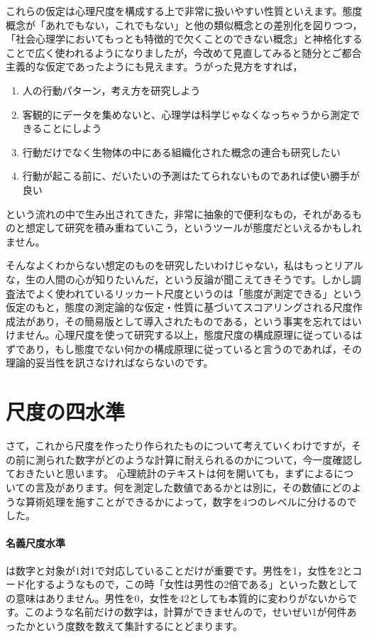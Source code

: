 \documentclass{ltjsbook}
\begin{document}
これらの仮定は心理尺度を構成する上で非常に扱いやすい性質といえます。態度概念が「あれでもない，これでもない」と他の類似概念との差別化を図りつつ，「社会心理学においてもっとも特徴的で欠くことのできない概念\citep{Allport1935}」と神格化することで広く使われるようになりましたが，今改めて見直してみると随分とご都合主義的な仮定であったようにも見えます。うがった見方をすれば，
\begin{enumerate}
    \item 人の行動パターン，考え方を研究しよう
    \item 客観的にデータを集めないと、心理学は科学じゃなくなっちゃうから測定できることにしよう
    \item 行動だけでなく生物体の中にある組織化された概念の連合も研究したい
    \item 行動が起こる前に、だいたいの予測はたてられないものであれば使い勝手が良い
\end{enumerate}
という流れの中で生み出されてきた，非常に抽象的で便利なもの，それがあるものと想定して研究を積み重ねていこう，というツールが態度だといえるかもしれません。


そんなよくわからない想定のものを研究したいわけじゃない，私はもっとリアルな，生の人間の心が知りたいんだ，という反論が聞こえてきそうです。しかし調査法でよく使われているリッカート尺度というのは「態度が測定できる」という仮定のもと，態度の測定論的な仮定・性質に基づいてスコアリングされる尺度作成法があり，その簡易版として導入されたものである，という事実を忘れてはいけません。心理尺度を使って研究する以上，態度尺度の構成原理に従っているはずであり，もし態度でない何かの構成原理に従っていると言うのであれば，その理論的妥当性を訊さなければならないのです。

\section{尺度の四水準}
さて，これから尺度を作ったり作られたものについて考えていくわけですが，その前に測られた数字がどのような計算に耐えられるのかについて，今一度確認しておきたいと思います。
心理統計のテキストは何を開いても，まず\citet{stevens1946}によるについての言及があります。何を測定した数値であるかとは別に，その数値にどのような算術処理を施すことができるかによって，数字を4つのレベルに分けるのでした。

\paragraph{名義尺度水準} は数字と対象が1対1で対応していることだけが重要です。男性を1，女性を2とコード化するようなもので，この時「女性は男性の2倍である」といった数としての意味はありません。男性を0，女性を42としても本質的に変わりがないからです。このような名前だけの数字は，計算ができませんので，せいぜい1が何件あったかという度数を数えて集計するにとどまります。
\end{document}
